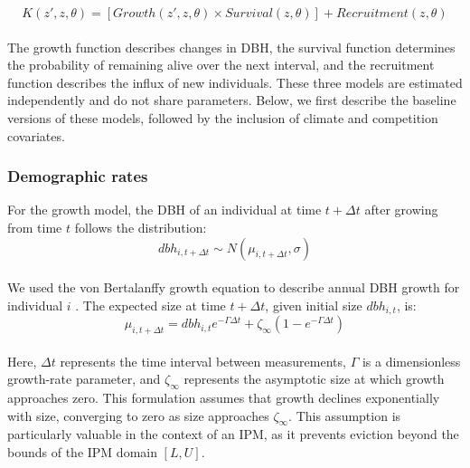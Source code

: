 \begin{equation}
K(z', z, \theta) = [Growth(z', z, \theta) \times Survival(z, \theta)] + Recruitment(z, \theta)
\label{eq:kernel}\end{equation}\\

The growth function describes changes in DBH, the survival function
determines the probability of remaining alive over the next interval,
and the recruitment function describes the influx of new individuals.
These three models are estimated independently and do not share
parameters. Below, we first describe the baseline versions of these
models, followed by the inclusion of climate and competition covariates.\\

\hypertarget{demographic-rates}{%
\subsubsection{Demographic rates}\label{demographic-rates}}

For the growth model, the DBH of an individual at time \(t + \Delta t\)
after growing from time \(t\) follows the distribution:\\

\begin{equation}
dbh_{i,t + \Delta t} \sim N(\mu_{i, t+\Delta t}, \sigma)
\label{eq:VBlik}\end{equation}\\

We used the von Bertalanffy growth equation to describe annual DBH
growth for individual \(i\) \citep{von1957quantitative}. The expected
size at time \(t + \Delta t\), given initial size \(dbh_{i,t}\), is:\\

\begin{equation}
\mu_{i, t+\Delta t} = dbh_{i,t} e^{-\Gamma \Delta t} + \zeta_{\infty} (1 - e^{-\Gamma \Delta t})
\label{eq:VBmodel}\end{equation}\\

Here, \(\Delta t\) represents the time interval between measurements,
\(\Gamma\) is a dimensionless growth-rate parameter, and
\(\zeta_{\infty}\) represents the asymptotic size at which growth
approaches zero. This formulation assumes that growth declines
exponentially with size, converging to zero as size approaches
\(\zeta_{\infty}\). This assumption is particularly valuable in the
context of an IPM, as it prevents eviction beyond the bounds of the IPM
domain \([L,U]\).\\

